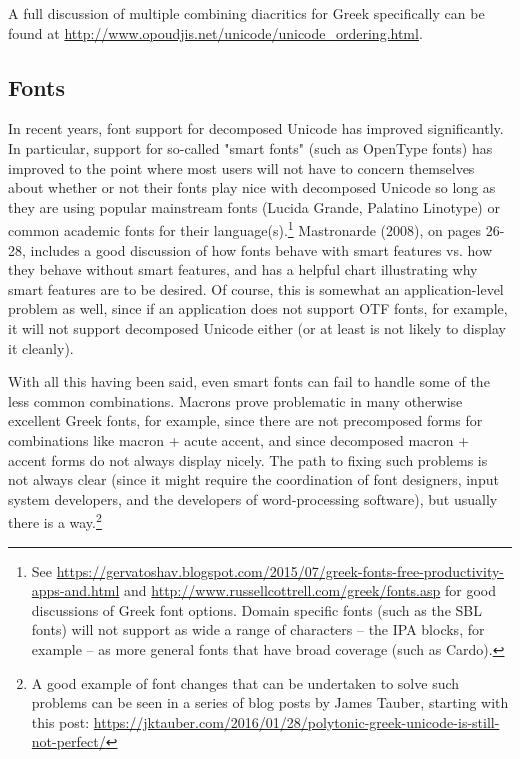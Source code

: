 \documentclass[11pt]{article}
\begin{document}
A full discussion of multiple combining diacritics for Greek specifically can be found at \url{http://www.opoudjis.net/unicode/unicode\_ordering.html}.

\subsection{Fonts}
\label{sec:org6044a2d}

In recent years, font support for decomposed Unicode has improved significantly. In particular, support for so-called "smart fonts" (such as OpenType fonts) has improved to the point where most users will not have to concern themselves about whether or not their fonts play nice with decomposed Unicode so long as they are using popular mainstream fonts (Lucida Grande, Palatino Linotype) or common academic fonts for their language(s).\footnote{See \url{https://gervatoshav.blogspot.com/2015/07/greek-fonts-free-productivity-apps-and.html} and \url{http://www.russellcottrell.com/greek/fonts.asp} for good discussions of Greek font options. Domain specific fonts (such as the SBL fonts) will not support as wide a range of characters -- the IPA blocks, for example -- as more general fonts that have broad coverage (such as Cardo).} Mastronarde (2008), on pages 26-28, includes a good discussion of how fonts behave with smart features vs. how they behave without smart features, and has a helpful chart illustrating why smart features are to be desired. Of course, this is somewhat an application-level problem as well, since if an application does not support OTF fonts, for example, it will not support decomposed Unicode either (or at least is not likely to display it cleanly).

With all this having been said, even smart fonts can fail to handle some of the less common combinations. Macrons prove problematic in many otherwise excellent Greek fonts, for example, since there are not precomposed forms for combinations like macron + acute accent, and since decomposed macron + accent forms do not always display nicely. The path to fixing such problems is not always clear (since it might require the coordination of font designers, input system developers, and the developers of word-processing software), but usually there is a way.\footnote{A good example of font changes that can be undertaken to solve such problems can be seen in a series of blog posts by James Tauber, starting with this post: \url{https://jktauber.com/2016/01/28/polytonic-greek-unicode-is-still-not-perfect/}}
\end{document}
